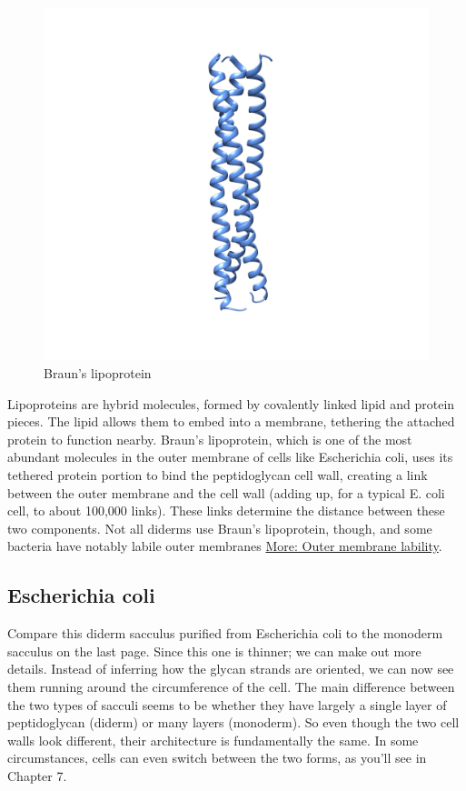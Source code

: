 \documentclass[]{tufte-book}
\begin{document}
\begin{figure}
\includegraphics{img/02_schematic/2_3_1_BLP} \caption[Braun's lipoprotein]{Braun's lipoprotein}\label{fig:2-3-1}
\end{figure}

Lipoproteins are hybrid molecules, formed by covalently linked lipid and
protein pieces. The lipid allows them to embed into a membrane,
tethering the attached protein to function nearby. Braun's lipoprotein,
which is one of the most abundant molecules in the outer membrane of
cells like Escherichia coli, uses its tethered protein portion to bind
the peptidoglycan cell wall, creating a link between the outer membrane
and the cell wall (adding up, for a typical E. coli cell, to about
100,000 links). These links determine the distance between these two
components. Not all diderms use Braun's lipoprotein, though, and some
bacteria have notably labile outer membranes \protect\hyperlink{}{More:
Outer membrane lability}.

\hypertarget{Diderm_sacculus_architecture}{\subsection{Escherichia
coli}\label{Diderm_sacculus_architecture}}

Compare this diderm sacculus purified from Escherichia coli to the
monoderm sacculus on the last page. Since this one is thinner; we can
make out more details. Instead of inferring how the glycan strands are
oriented, we can now see them running around the circumference of the
cell. The main difference between the two types of sacculi seems to be
whether they have largely a single layer of peptidoglycan (diderm) or
many layers (monoderm). So even though the two cell walls look
different, their architecture is fundamentally the same. In some
circumstances, cells can even switch between the two forms, as you'll
see in Chapter 7.
\end{document}
